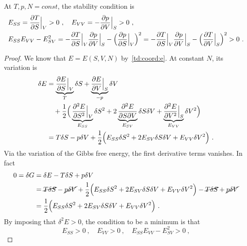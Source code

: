     At $T, p, N = const$, the stability condition is 
    \begin{equation}\label{td:stab}
    \begin{aligned}
        & E_{SS} = \frac{\partial T}{\partial S} \Big \vert_V > 0 ~, \quad E_{VV} = - \frac{\partial p}{\partial V} \Big \vert_S > 0 ~, \\ & E_{SS}E_{VV} - E^2_{SV} = - \frac{\partial T}{\partial S} \Big \vert_V \frac{\partial p}{\partial V} \Big \vert_S - \Big ( \frac{\partial p}{\partial S} \Big \vert_V \Big )^2 = - \frac{\partial T}{\partial S} \Big \vert_V \frac{\partial p}{\partial V} \Big \vert_S - \Big ( \frac{\partial T}{\partial V} \Big \vert_S \Big )^2 > 0 ~.
    \end{aligned}
    \end{equation}
    \begin{proof}
        We know that $E = E(S, V, N)$ by~\eqref{td:coord:e}. At constant $N$, its variation is 
        \begin{equation*}
        \begin{aligned}
            \delta E & = \underbrace{\frac{\partial E}{\partial S} \Big \vert_V }_T \delta S + \underbrace{\frac{\partial E}{\partial V} \Big \vert_S}_{-p} \delta V  \\ & \quad + \frac{1}{2} \Big ( \underbrace{\frac{\partial^2 E}{\partial S^2} \Big \vert_V}_{E_{SS}} \delta S^2 + 2 \underbrace{\frac{\partial^2 E}{\partial S \partial V}}_{E_{SV}} \delta S \delta V + \underbrace{\frac{\partial^2 E}{\partial V^2} \Big \vert_S }_{E_{VV}} \delta V^2 \Big) \\ & = T \delta S - p \delta V + \frac{1}{2} \Big ( E_{SS} \delta S^2 + 2 E_{SV} \delta S \delta V + E_{VV} \delta V^2 \Big) ~.
        \end{aligned}
        \end{equation*}
        Via the variation of the Gibbs free energy, the first derivative terms vanishes. In fact
        \begin{equation*}
        \begin{aligned}
            0 = \delta G &= \delta E - T \delta S + p \delta V \\ & = \cancel{T \delta S} - \cancel{p \delta V} + \frac{1}{2} \Big ( E_{SS} \delta S^2 + 2 E_{SV} \delta S \delta V + E_{VV} \delta V^2 \Big) - \cancel{T \delta S} + \cancel{p \delta V} \\ & = \frac{1}{2} \Big ( E_{SS} \delta S^2 + 2 E_{SV} \delta S \delta V + E_{VV} \delta V^2 \Big) ~.
        \end{aligned}
        \end{equation*}
        By imposing that $\delta^2 E > 0$, the condition to be a minimum is that 
        \begin{equation*}
            E_{SS} > 0 ~, \quad E_{VV} > 0 ~, \quad E_{SS} E_{VV} - E_{SV}^2 > 0 ~,

\end{equation*}
\end{proof}
